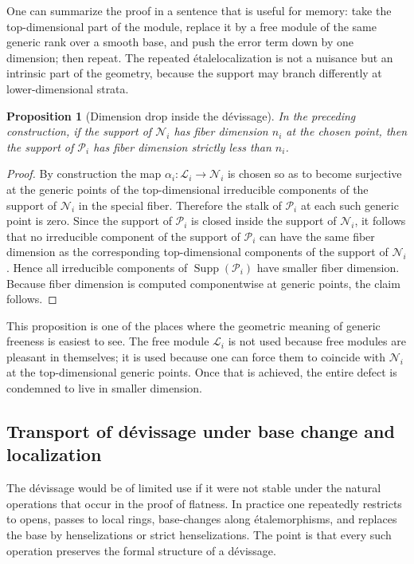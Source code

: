 \documentclass[11pt,oneside]{article}
\newtheorem{proposition}[theorem]{Proposition}
\newcommand{\Lcal}{\mathcal L}
\newcommand{\N}{\mathcal N}
\newcommand{\Pcal}{\mathcal P}
\newcommand{\Supp}{\operatorname{Supp}}
\newcommand{\etale}{\'etale}
\begin{document}
One can summarize the proof in a sentence that is useful for memory: take the top-dimensional part of the module, replace it by a free module of the same generic rank over a smooth base, and push the error term down by one dimension; then repeat.  The repeated \etale localization is not a nuisance but an intrinsic part of the geometry, because the support may branch differently at lower-dimensional strata.

\begin{proposition}[Dimension drop inside the d\'evissage]\label{prop:dimension-drop-long}
In the preceding construction, if the support of $\N_i$ has fiber dimension $n_i$ at the chosen point, then the support of $\Pcal_i$ has fiber dimension strictly less than $n_i$.
\end{proposition}

\begin{proof}
By construction the map $\alpha_i\colon \Lcal_i\to \N_i$ is chosen so as to become surjective at the generic points of the top-dimensional irreducible components of the support of $\N_i$ in the special fiber.  Therefore the stalk of $\Pcal_i$ at each such generic point is zero.  Since the support of $\Pcal_i$ is closed inside the support of $\N_i$, it follows that no irreducible component of the support of $\Pcal_i$ can have the same fiber dimension as the corresponding top-dimensional components of the support of $\N_i$.  Hence all irreducible components of $\Supp(\Pcal_i)$ have smaller fiber dimension.  Because fiber dimension is computed componentwise at generic points, the claim follows.
\end{proof}

This proposition is one of the places where the geometric meaning of generic freeness is easiest to see.  The free module $\Lcal_i$ is not used because free modules are pleasant in themselves; it is used because one can force them to coincide with $\N_i$ at the top-dimensional generic points.  Once that is achieved, the entire defect is condemned to live in smaller dimension.

\subsection{Transport of d\'evissage under base change and localization}

The d\'evissage would be of limited use if it were not stable under the natural operations that occur in the proof of flatness.  In practice one repeatedly restricts to opens, passes to local rings, base-changes along \etale morphisms, and replaces the base by henselizations or strict henselizations.  The point is that every such operation preserves the formal structure of a d\'evissage.
\end{document}
